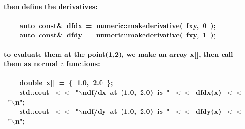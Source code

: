 \documentclass[9pt,onside,a4paper]{article}
\newcommand{\hlstd}[1]{\textcolor[rgb]{0.2,0,0.4}{#1}}
\newcommand{\hlnum}[1]{\textcolor[rgb]{0.2,0.73,0.02}{#1}}
\newcommand{\hlesc}[1]{\textcolor[rgb]{0.65,0.09,0.38}{#1}}
\newcommand{\hlstr}[1]{\textcolor[rgb]{0.09,0.38,0.65}{#1}}
\newcommand{\hlopt}[1]{\textcolor[rgb]{0.33,0.33,0.33}{#1}}
\newcommand{\hlkwb}[1]{\textcolor[rgb]{0.96,0.55,0.14}{#1}}
\newcommand{\hlkwc}[1]{\textcolor[rgb]{0,0,1}{#1}}
\newcommand{\hlkwd}[1]{\textcolor[rgb]{0.82,0.11,0.93}{#1}}
\begin{document}
\paragraph{then define the derivatives:}
\paragraph{\hlstd{}\hlstd{\ \ \ \ }\hlstd{}\hlkwc{auto\ }\hlstd{}\hlkwb{const}\hlstd{}\hlopt{\&\ }\hlstd{dfdx\ }\hlopt{=\ }\hlstd{numeric}\hlopt{::}\hlstd{}\hlkwd{make\textunderscore derivative}\hlstd{}\hlopt{(\ }\hlstd{fxy}\hlopt{,\ }\hlstd{}\hlnum{0\ }\hlstd{}\hlopt{);}\hspace*{\fill}\\
\hlstd{}\hlstd{\ \ \ \ }\hlstd{}\hlkwc{auto\ }\hlstd{}\hlkwb{const}\hlstd{}\hlopt{\&\ }\hlstd{dfdy\ }\hlopt{=\ }\hlstd{numeric}\hlopt{::}\hlstd{}\hlkwd{make\textunderscore derivative}\hlstd{}\hlopt{(\ }\hlstd{fxy}\hlopt{,\ }\hlstd{}\hlnum{1\ }\hlstd{}\hlopt{);}\hspace*{\fill}\\
}

\paragraph{to evaluate them at the point(1,2), we make an array x[], then call them as normal c functions:}
\paragraph{\hlstd{\ \ \ \ }\hlstd{}\hlkwb{double\ }\hlstd{x}\hlopt{{[}{]}\ =\ \{\ }\hlstd{}\hlnum{1.0}\hlstd{}\hlopt{,\ }\hlstd{}\hlnum{2.0\ }\hlstd{}\hlopt{\};}\hspace*{\fill}\\
\hlstd{}\hlstd{\ \ \ \ }\hlstd{std}\hlopt{::}\hlstd{cout\ }\hlopt{$<$$<$\ }\hlstd{}\hlstr{"}\hlesc{$\backslash$n}\hlstr{df/dx\ at\ (1.0,\ 2.0)\ is\ "}\hlstd{\ }\hlopt{$<$$<$\ }\hlstd{}\hlkwd{dfdx}\hlstd{}\hlopt{(}\hlstd{x}\hlopt{)\ $<$$<$\ }\hlstd{}\hlstr{"}\hlesc{$\backslash$n}\hlstr{"}\hlstd{}\hlopt{;}\hspace*{\fill}\\
\hlstd{}\hlstd{\ \ \ \ }\hlstd{std}\hlopt{::}\hlstd{cout\ }\hlopt{$<$$<$\ }\hlstd{}\hlstr{"}\hlesc{$\backslash$n}\hlstr{df/dy\ at\ (1.0,\ 2.0)\ is\ "}\hlstd{\ }\hlopt{$<$$<$\ }\hlstd{}\hlkwd{dfdy}\hlstd{}\hlopt{(}\hlstd{x}\hlopt{)\ $<$$<$\ }\hlstd{}\hlstr{"}\hlesc{$\backslash$n}\hlstr{"}\hlstd{}\hlopt{;}\hspace*{\fill}\\}
\end{document}
